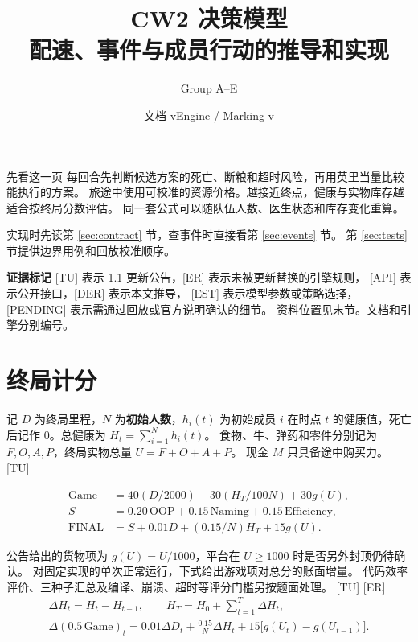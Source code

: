 \documentclass[UTF8,11pt,a4paper]{ctexart}
\title{\vspace{-1.3cm}\textbf{CW2 决策模型}\\[3pt]
  \large 配速、事件与成员行动的推导和实现}
\author{Group A--E}
\date{\DocDate\quad 文档 v\DocVersion\quad Engine / Marking v\EngineVersion}
\newcommand{\src}[1]{\textup{\small\textcolor{muted}{[#1]}}}
\begin{document}
\maketitle
\thispagestyle{fancy}

\begin{keybox}{先看这一页}
每回合先判断候选方案的死亡、断粮和超时风险，再用英里当量比较能执行的方案。
旅途中使用可校准的资源价格。越接近终点，健康与实物库存越适合按终局分数评估。
同一套公式可以随队伍人数、医生状态和库存变化重算。
\end{keybox}

\noindent 实现时先读第 \ref{sec:contract} 节，查事件时直接看第 \ref{sec:events} 节。
第 \ref{sec:tests} 节提供边界用例和回放校准顺序。

\smallskip
\noindent\textbf{证据标记}
\src{TU} 表示 1.1 更新公告，\src{ER} 表示未被更新替换的引擎规则，
\src{API} 表示公开接口，\src{DER} 表示本文推导，
\src{EST} 表示模型参数或策略选择，\src{PENDING} 表示需通过回放或官方说明确认的细节。
资料位置见末节。文档和引擎分别编号。

\setcounter{tocdepth}{1}
\tableofcontents

\clearpage
\section{终局计分}\label{sec:objective}

记 $D$ 为终局里程，$N$ 为\textbf{初始人数}，$h_i(t)$ 为初始成员 $i$ 在时点 $t$
的健康值，死亡后记作 $0$。总健康为 $H_t=\sum_{i=1}^N h_i(t)$。
食物、牛、弹药和零件分别记为 $F,O,A,P$，终局实物总量 $U=F+O+A+P$。
现金 $M$ 只具备途中购买力。 \src{TU}

\[
\begin{aligned}
\mathrm{Game} &=40(D/2000)+30(H_T/100N)+30g(U),\\
S&=0.20\,\mathrm{OOP}+0.15\,\mathrm{Naming}+0.15\,\mathrm{Efficiency},\\
\mathrm{FINAL}&=S+0.01D+(0.15/N)H_T+15g(U).
\end{aligned}
\]

公告给出的货物项为 $g(U)=U/1000$，平台在 $U\ge 1000$ 时是否另外封顶仍待确认。
对固定实现的单次正常运行，下式给出游戏项对总分的账面增量。
代码效率评价、三种子汇总及编译、崩溃、超时等评分门槛另按题面处理。 \src{TU} \src{ER}
\[
\begin{gathered}
 \Delta H_t=H_t-H_{t-1},\qquad H_T=H_0+\sum_{t=1}^{T}\Delta H_t,\\
 \Delta(0.5\,\mathrm{Game})_t=
 0.01\Delta D_t+\frac{0.15}{N}\Delta H_t
       +15\bigl[g(U_t)-g(U_{t-1})\bigr].
\end{gathered}
\]
\end{document}
